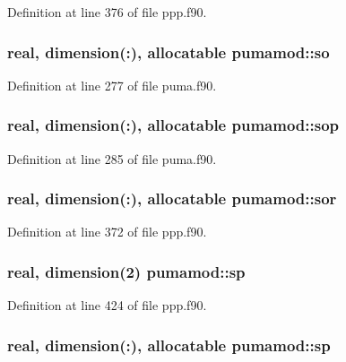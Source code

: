 \-Definition at line 376 of file ppp.\-f90.

\hypertarget{classpumamod_ab0c826a52384cc9195a2244e7003cab8}{
\subsubsection[{so}]{\setlength{\rightskip}{0pt plus 5cm}real, dimension(\-:), allocatable {\bf pumamod\-::so}}}
\label{classpumamod_ab0c826a52384cc9195a2244e7003cab8}


\-Definition at line 277 of file puma.\-f90.

\hypertarget{classpumamod_ad94d9ab7dd97c7f24ccfca4e9c1dcadd}{
\subsubsection[{sop}]{\setlength{\rightskip}{0pt plus 5cm}real, dimension(\-:), allocatable {\bf pumamod\-::sop}}}
\label{classpumamod_ad94d9ab7dd97c7f24ccfca4e9c1dcadd}


\-Definition at line 285 of file puma.\-f90.

\hypertarget{classpumamod_a25b4901a49e21188037f1e234de26a52}{
\subsubsection[{sor}]{\setlength{\rightskip}{0pt plus 5cm}real, dimension(\-:), allocatable {\bf pumamod\-::sor}}}
\label{classpumamod_a25b4901a49e21188037f1e234de26a52}


\-Definition at line 372 of file ppp.\-f90.

\hypertarget{classpumamod_a7ca052eca893b2dd15b3e2c59417383b}{
\subsubsection[{sp}]{\setlength{\rightskip}{0pt plus 5cm}real, dimension(2) {\bf pumamod\-::sp}}}
\label{classpumamod_a7ca052eca893b2dd15b3e2c59417383b}


\-Definition at line 424 of file ppp.\-f90.

\hypertarget{classpumamod_a62dbb101d0fe728fa2231fa3482ee7b1}{
\subsubsection[{sp}]{\setlength{\rightskip}{0pt plus 5cm}real, dimension(\-:), allocatable {\bf pumamod\-::sp}}}
\label{classpumamod_a62dbb101d0fe728fa2231fa3482ee7b1}


